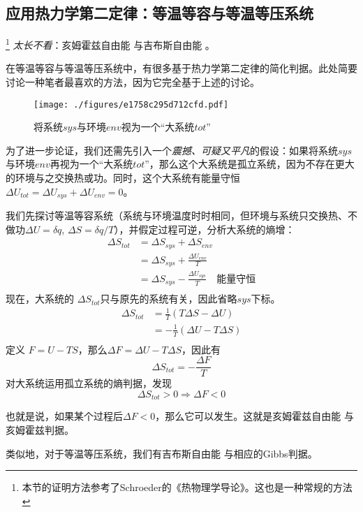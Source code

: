 \subsection{应用热力学第二定律：等温等容与等温等压系统}
\footnote{本节的证明方法参考了Schroeder的《热物理学导论》。这也是一种常规的方法} 
\textsl{太长不看}：亥姆霍兹自由能 与吉布斯自由能 。

在等温等容与等温等压系统中，有很多基于热力学第二定律的简化判据。此处简要讨论一种笔者最喜欢的方法，因为它完全基于上述的讨论。

\begin{figure}[ht]
\centering
\texttt{[image: ./figures/e1758c295d712cfd.pdf]}
\caption{将系统$sys$与环境$env$视为一个“大系统$tot$”} \label{fig_Td2Law_3}
\end{figure}

为了进一步论证，我们还需先引入一个\textsl{震撼、可疑又平凡}的假设：如果将系统$sys$与环境$env$再视为一个“大系统$tot$”，那么这个大系统是孤立系统，因为不存在更大的环境与之交换热或功。同时，这个大系统有能量守恒 $\Delta U_{tot} = \Delta U_{sys} + \Delta U_{env} = 0$。

我们先探讨等温等容系统（系统与环境温度时时相同，但环境与系统只交换热、不做功$\Delta U = \delta q$, $\Delta S = \delta q / T$），并假定过程可逆，分析大系统的熵增：
$$
\begin{aligned}
\Delta {S_{tot}}
 &=\Delta {S_{sys}}+\Delta {S_{env}}\\
 & =\Delta {S_{sys}}+ \frac{\Delta U_{{env}}}{T}\\
 & = \Delta {S_{sys}} - \frac{\Delta U_{{sys}}}{T} \quad \text{能量守恒}\\
 \end{aligned}
$$
现在，大系统的 $\Delta {S_{tot}}$只与原先的系统有关，因此省略$sys$下标。
$$
\begin{aligned}
\Delta {S_{tot}}
 & = \frac{1}{T}(T \Delta {S} -\Delta U )\\
 & = - \frac{1}{T}(\Delta U - T \Delta {S} )\\
\end{aligned}
$$
定义 $F = U-TS$，那么$\Delta F = \Delta U - T \Delta S$，因此有
$$
\Delta S_{tot} = -\frac{\Delta F}{T}
$$
对大系统运用孤立系统的熵判据，发现
$$\Delta S_{tot} > 0\Rightarrow \Delta F < 0$$

也就是说，如果某个过程后$\Delta F < 0$，那么它可以发生。这就是亥姆霍兹自由能 与 亥姆霍兹判据。

类似地，对于等温等压系统，我们有吉布斯自由能 与相应的Gibbs判据。

